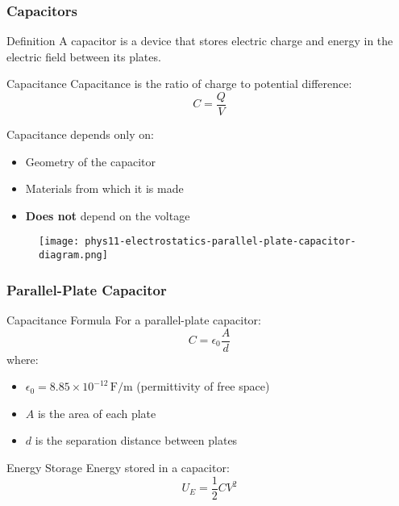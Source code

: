 \documentclass{beamer}
\begin{document}
\begin{frame}
    \frametitle{Capacitors}
    \begin{block}{Definition}
        A capacitor is a device that stores electric charge and energy in the electric field between its plates.
    \end{block}
    
    \begin{block}{Capacitance}
        Capacitance is the ratio of charge to potential difference:
        \begin{equation}
            C = \frac{Q}{V}
        \end{equation}
        
        Capacitance depends only on:
        \begin{itemize}
            \item Geometry of the capacitor
            \item Materials from which it is made
            \item \textbf{Does not} depend on the voltage
        \end{itemize}
    \end{block}
    \end{frame}

\begin{frame}
    
       \begin{figure}
           \centering
           \texttt{[image: phys11-electrostatics-parallel-plate-capacitor-diagram.png]}
       \end{figure}
    
\end{frame}

\begin{frame}
    \frametitle{Parallel-Plate Capacitor}
    \begin{block}{Capacitance Formula}
        For a parallel-plate capacitor:
        \begin{equation}
            C = \epsilon_0 \frac{A}{d}
        \end{equation}
        where:
        \begin{itemize}
            \item $\epsilon_0 = 8.85 \times 10^{-12} \, \text{F/m}$ (permittivity of free space)
            \item $A$ is the area of each plate
            \item $d$ is the separation distance between plates
        \end{itemize}
    \end{block}
    
    \begin{block}{Energy Storage}
        Energy stored in a capacitor:
        \begin{equation}
            U_E = \frac{1}{2}CV^2
        \end{equation}
    \end{block}
\end{frame}
\end{document}
